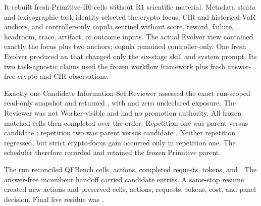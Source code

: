 
 It rebuilt
\ReviewerPolicyVTwoQualRTwoHZeroCells{} fresh Primitive-H0 cells without R1
scientific material. Metadata strata and lexicographic task identity selected
the crypto focus, CIR and historical-VaR anchors, and controller-only copula
sentinel without score, reward, failure, headroom, trace, artifact, or outcome
inputs. The actual Evolver view contained exactly the focus plus two anchors;
copula remained controller-only. One fresh Evolver produced an
\ReviewerPolicyVTwoQualRTwoProposal{} that changed only the six-stage skill and
system prompt. Its two task-agnostic claims used the frozen workflow framework
plus fresh answer-free crypto and CIR observations.

Exactly one Candidate Information-Set Reviewer assessed the exact run-scoped
read-only snapshot and returned \ReviewerPolicyVTwoQualRTwoReview{}, with
\ReviewerPolicyVTwoQualRTwoClaimReview{} and zero undeclared exposure. The
Reviewer was not Worker-visible and had no promotion authority. All
\ReviewerPolicyVTwoQualRTwoMatchedCells{} frozen matched cells then completed
over the \ReviewerPolicyVTwoQualRTwoVectorOrder{} order. Repetition one was
parent \ReviewerPolicyVTwoQualRTwoRepOneParent{} versus candidate
\ReviewerPolicyVTwoQualRTwoRepOneCandidate{}; repetition two was parent
\ReviewerPolicyVTwoQualRTwoRepTwoParent{} versus candidate
\ReviewerPolicyVTwoQualRTwoRepTwoCandidate{}. Neither repetition regressed,
but strict crypto-focus gain occurred only in repetition one. The scheduler
therefore recorded \ReviewerPolicyVTwoQualRTwoDecision{} and retained the
frozen Primitive parent.

The run reconciled \ReviewerPolicyVTwoQualRTwoQFBenchCells{} QFBench cells,
\ReviewerPolicyVTwoQualRTwoActions{} actions,
\ReviewerPolicyVTwoQualRTwoRequests{} completed requests,
\ReviewerPolicyVTwoQualRTwoTokens{} tokens, and
\ReviewerPolicyVTwoQualRTwoCost{}. The answer-free incumbent handoff carried
\ReviewerPolicyVTwoQualRTwoCarryEntries{} candidate entries. A same-stop
resume created \ReviewerPolicyVTwoQualRTwoResumeActions{} new actions and
preserved cells, actions, requests, tokens, cost, and panel decision. Final
live residue was \ReviewerPolicyVTwoQualRTwoLiveResidue{}.

